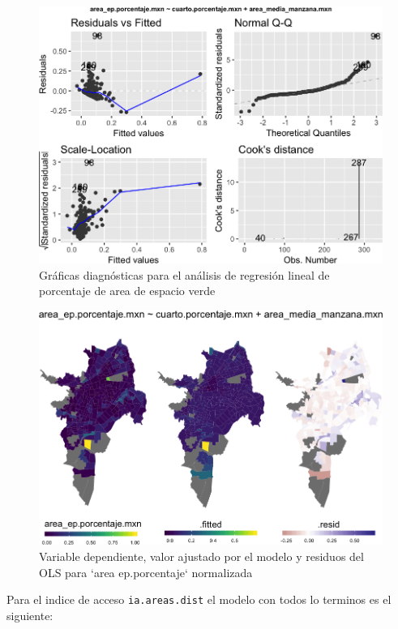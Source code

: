 \documentclass[12pt,]{book}
\begin{document}
\begin{figure}
\includegraphics[width=1\linewidth]{tesis-unigis_files/figure-latex/diagn-lm-areaep-sel-1} \caption{Gráficas diagnósticas para el análisis de regresión lineal de porcentaje de area de espacio verde}\label{fig:diagn-lm-areaep-sel}
\end{figure}

\begin{figure}
\includegraphics[width=1\linewidth]{tesis-unigis_files/figure-latex/mapas-lm-areaep-1} \caption{Variable dependiente, valor ajustado por el modelo y residuos del OLS para `area ep.porcentaje` normalizada}\label{fig:mapas-lm-areaep}
\end{figure}

Para el indice de acceso \texttt{ia.areas.dist} el modelo con todos lo
terminos es el siguiente:
\end{document}
